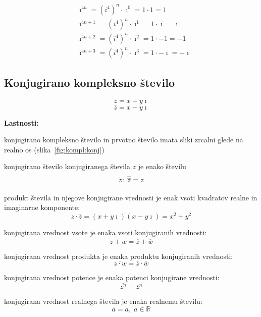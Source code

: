 \documentclass[a4paper,oneside,12pt,fleqn]{article}
\def\R{\ensuremath{\mathbb R}}
\newcommand\krat\cdot
\newcommand{\ii}{\ensuremath{\imath}}
\def\konj{\overline} %
\numberwithin{equation}{section}
\newenvironment{itemize*}%
{
\vspace{-12pt}%
\begin{itemize}%
\setlength{\itemsep}{0pt}%
\setlength{\parskip}{2pt}}%
{\end{itemize}}
\begin{document}
\begin{align*}
  &\ii^{4n} = (i^4)^n \krat \ii^0 = 1 \krat 1 = 1 \\
  &\ii^{4n+1} = (i^4)^n \krat \ii^1 = 1 \krat \ii = \ii \\
  &\ii^{4n+2} = (i^4)^n \krat \ii^2 = 1 \krat -1 = -1 \\
  &\ii^{4n+3} = (i^4)^n \krat \ii^3 = 1 \krat -\ii = -\ii
\end{align*}

\subsection{Konjugirano kompleksno število}
\[ z = x+y\ii \]
\[ \konj{z} = x-y\ii \]

\textbf{Lastnosti:}
\begin{itemize*}
  \item konjugirano kompleksno število in prvotno število imata sliki zrcalni glede na
    realno os (slika~\ref{fig:kompl:konj})
  \item konjugirano število konjugiranega števila $z$ je enako številu \[ z$:
    $\konj{\konj{z}} = z \]
  \item produkt števila in njegove konjugirane vrednosti je enak vsoti kvadratov realne in
    imaginarne komponente: \begin{equation} z\krat \konj{z} = (x+y\ii)(x-y\ii) = x^2+y^2 \label{eq:kompl:zzkonj} \end{equation}
  \item konjugirana vrednost vsote je enaka vsoti konjugiranih vrednosti: 
    \begin{equation}
      \konj{z+w} = \konj{z} + \konj{w}
      \label{eq:kompl:konj:plus}
    \end{equation}
  \item konjugirana vrednost produkta je enaka produktu konjugiranih vrednosti:
    \begin{equation}
      \konj{z\krat w} = \konj{z} \krat \konj{w}
      \label{eq:kompl:konj:krat}
    \end{equation}
  \item konjugirana vrednost potence je enaka potenci konjugirane vrednosti:
    \begin{equation}
      \konj{z^n} = \konj{z}^n
      \label{eq:kompl:konj:pot}
    \end{equation}
  \item konjugirana vrednost realnega števila je enaka realnemu številu:
    \begin{equation}
      \konj{a} = a, \; a \in \R
      \label{eq:kompl:konj:konst}
    \end{equation}
\end{itemize*}
\end{document}
